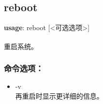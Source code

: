 \subsection{reboot}
\textbf{usage}: reboot [<可选选项>] \\
\\ 重启系统。

\subsubsection{命令选项：}
\begin{itemize}
	\item -v \\
	再重启时显示更详细的信息。
\end{itemize}


%
%
